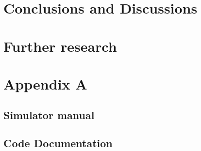 \documentclass[twoside,openright]{uva-bachelor-thesis}
\begin{document}
\chapter{Conclusions and Discussions}

\chapter{Further research}

\chapter{Appendix A}

\section{Simulator manual}

\section{Code Documentation}
\end{document}
